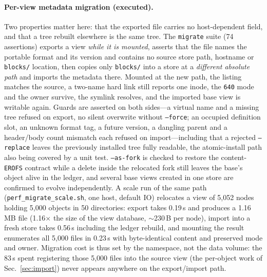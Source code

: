 \documentclass[numberedsection,acmtos]{acmart}
\begin{document}
\paragraph{Per-view metadata migration (executed).} Two properties matter here:
that the exported file carries no host-dependent field, and that a tree rebuilt
elsewhere is the same tree. The \texttt{migrate} suite (74 assertions) exports a
view \emph{while it is mounted}, asserts that the file names the portable format
and its version and contains no source store path, hostname or \texttt{blocks/}
location, then copies only \texttt{blocks/} into a store at a \emph{different
absolute path} and imports the metadata there. Mounted at the new path, the
listing matches the source, a two-name hard link still reports one inode, the
\texttt{640} mode and the owner survive, the symlink resolves, and the imported
base view is writable again. Guards are asserted on both sides---a virtual name
and a missing tree refused on export, no silent overwrite without
\texttt{--force}; an occupied definition slot, an unknown format tag, a future
version, a dangling parent and a header/body count mismatch each refused on
import---including that a rejected \texttt{--replace} leaves the previously
installed tree fully readable, the atomic-install path also being covered by a
unit test. \texttt{--as-fork} is checked to restore the content-\texttt{EROFS}
contract while a delete inside the relocated fork still leaves the base's object
alive in the ledger, and several base views created in one store are confirmed
to evolve independently. A scale run of the same path (\texttt{perf\_migrate\_scale.sh},
one host, default IO) relocates a view of 5{,}052 nodes holding 5{,}000 objects
in 50 directories: export takes 0.19\,s and produces a 1.16\,MB file
(1.16$\times$ the size of the view database, $\sim$230\,B per node), import into a
fresh store takes 0.56\,s including the ledger rebuild, and mounting the result
enumerates all 5{,}000 files in 0.23\,s with byte-identical content and preserved
mode and owner. Migration cost is thus set by the namespace, not the data
volume: the 83\,s spent registering those 5{,}000 files into the source view
(the per-object work of Sec.~\ref{sec:import}) never appears anywhere on the
export/import path.
\end{document}
